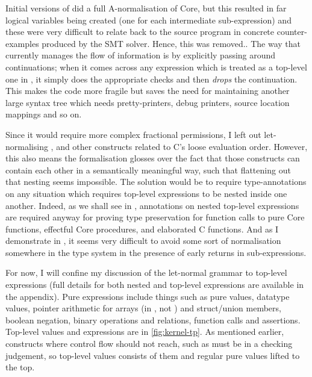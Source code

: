 Initial versions of  did a full A-normalisation of Core, but this resulted
in far logical variables being created (one for each intermediate sub-expression)
and these were very difficult to relate back to the source program in concrete
counter-examples produced by the SMT solver. Hence, this was
removed..
The way that  currently manages the flow of information is by explicitly
passing around continuations; when it comes across any expression which is
treated as a top-level one in , it simply does the appropriate
checks and then \emph{drops} the continuation.
This makes the code more fragile but saves the need for maintaining another large
syntax tree which needs pretty-printers, debug printers, source location
mappings and so on.

Since it would require more complex fractional permissions, I left out
let-normalising ,  and other %
constructs related to C's loose evaluation order. However, this also means
the formalisation glosses over the fact that those constructs can contain each
other in a semantically meaningful way, such that flattening out that nesting
seems impossible. The solution would be to require type-annotations on any
situation which requires top-level expressions to be nested inside one another.
Indeed, as we shall see in , annotations on
nested top-level expressions are required anyway for proving type preservation
for function calls to pure Core functions, effectful Core procedures, and
elaborated C functions. And as I demonstrate in ,
it seems very difficult to avoid some sort of normalisation somewhere in
the type system in the presence of early returns in sub-expressions.

For now, I will confine my discussion of the let-normal grammar to top-level
expressions (full details for both nested and top-level expressions are
available in the appendix). Pure expressions include things such as pure values,
datatype values, pointer arithmetic for arrays (in , not )
and struct/union members, boolean negation, binary operations and relations, function
calls and assertions. Top-level values and expressions are in
\cref{fig:kernel-tp}. As mentioned earlier, constructs where control flow
should not reach, such as  must be in a checking %
judgement, so top-level values consists of them and regular pure values lifted
to the top.

